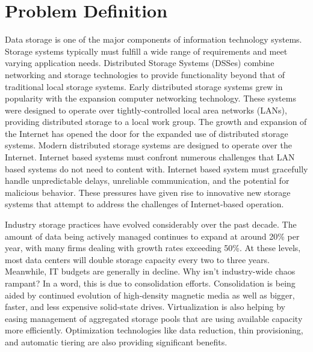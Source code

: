 \documentclass[11pt]{article}
\begin{document}
\section{Problem Definition}
Data storage is one of the major components of information
technology systems. Storage systems typically must fulfill a wide
range of requirements and meet varying application needs.
Distributed Storage Systems (DSSes) combine networking and storage
technologies to provide functionality beyond that of traditional local
storage systems. Early distributed storage systems grew in
popularity with the expansion computer networking technology. These
systems were designed to operate over tightly-controlled local area
networks (LANs), providing distributed storage to a local work group.
The growth and expansion of the Internet has opened the door for
the expanded use of distributed storage systems.
Modern distributed storage systems are designed to operate over the Internet. 
Internet based systems must confront numerous
challenges that LAN based systems do not need to content with.
Internet based system must gracefully handle unpredictable delays,
unreliable communication, and the potential for malicious behavior.
These pressures have given rise to 
innovative new storage systems that attempt to
address the challenges of Internet-based operation.

Industry storage practices have evolved considerably over the past
decade. The amount of data being actively managed continues to expand
at around 20\% per year, with many firms dealing with growth rates
exceeding 50\%. At these levels, most data centers will double storage
capacity every two to three years. Meanwhile, IT budgets are generally
in decline. Why isn't industry-wide chaos rampant? In a word, this is
due to consolidation efforts. Consolidation is being aided by
continued evolution of high-density magnetic media as well as bigger,
faster, and less expensive solid-state drives. Virtualization is also
helping by easing management of aggregated storage pools that are
using available capacity more efficiently. Optimization technologies
like data reduction, thin provisioning, and automatic tiering are also
providing significant benefits.
\end{document}
